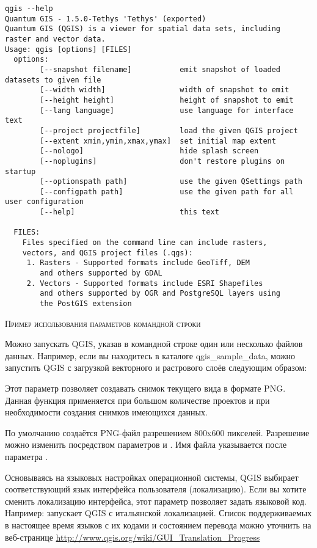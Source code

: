 \small
\begin{verbatim}
qgis --help
Quantum GIS - 1.5.0-Tethys 'Tethys' (exported)
Quantum GIS (QGIS) is a viewer for spatial data sets, including
raster and vector data.
Usage: qgis [options] [FILES]
  options:
        [--snapshot filename]           emit snapshot of loaded datasets to given file
        [--width width]                 width of snapshot to emit
        [--height height]               height of snapshot to emit
        [--lang language]               use language for interface text
        [--project projectfile]         load the given QGIS project
        [--extent xmin,ymin,xmax,ymax]  set initial map extent
        [--nologo]                      hide splash screen
        [--noplugins]                   don't restore plugins on startup
        [--optionspath path]            use the given QSettings path
        [--configpath path]             use the given path for all user configuration
        [--help]                        this text

  FILES:
    Files specified on the command line can include rasters,
    vectors, and QGIS project files (.qgs):
     1. Rasters - Supported formats include GeoTiff, DEM
        and others supported by GDAL
     2. Vectors - Supported formats include ESRI Shapefiles
        and others supported by OGR and PostgreSQL layers using
        the PostGIS extension
\end{verbatim}
\normalsize

\begin{Tip} \caption{\textsc{Пример использования параметров командной строки}}
Можно запускать QGIS, указав в командной строке один или несколько файлов
данных. Например, если вы находитесь в каталоге qgis\_sample\_data,
можно запустить QGIS с загрузкой векторного и растрового
слоёв следующим образом: \\
\end{Tip}

Этот параметр позволяет создавать снимок текущего вида в формате PNG. Данная
функция применяется при большом количестве проектов и при необходимости
создания снимков имеющихся данных.

По умолчанию создаётся PNG-файл разрешением 800x600 пикселей. Разрешение
можно изменить посредством параметров
 и . Имя файла указывается после параметра
.

Основываясь на языковых настройках операционной системы, QGIS выбирает
соответствующий язык интерфейса пользователя (локализацию). Если вы хотите
сменить локализацию интерфейса, этот параметр позволяет задать языковой код. Например:
 запускает QGIS с итальянской локализацией. Список
поддерживаемых в настоящее время языков с их кодами и состоянием перевода можно
уточнить на веб-странице
\url{http://www.qgis.org/wiki/GUI_Translation_Progress}

